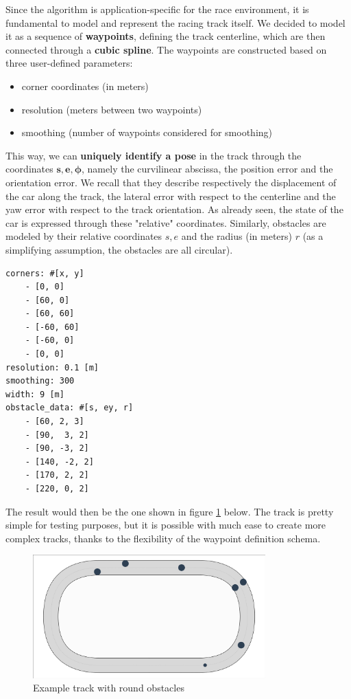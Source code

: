 \documentclass[a4paper, onecolumn, 11pt]{article}
\begin{document}
Since the algorithm is application-specific for the race environment, it is
fundamental to model and represent the racing track itself. We decided to model
it as a sequence of \textbf{waypoints}, defining the track centerline, which are
then connected through a \textbf{cubic spline}. The waypoints are constructed
based on three user-defined parameters:
\begin{itemize}
    \item corner coordinates (in meters)
    \item resolution (meters between two waypoints)
    \item smoothing (number of waypoints considered for smoothing)
\end{itemize}
This way, we can \textbf{uniquely identify a pose} in the track through the
coordinates $\mathbf{s,e,\phi}$, namely the curvilinear abscissa, the position
error and the orientation error. We recall that they describe respectively the
displacement of the car along the track, the lateral error with respect to the
centerline and the yaw error with respect to the track orientation. As already
seen, the state of the car is expressed through these "relative" coordinates.
Similarly, obstacles are modeled by their relative coordinates $s,e$ and the
radius (in meters) $r$ (as a simplifying assumption, the obstacles are all
circular).
\begin{Verbatim}[frame=single,label=Example of a track configuration file,labelposition=topline,framesep=10pt]
corners: #[x, y]
    - [0, 0]
    - [60, 0]
    - [60, 60]
    - [-60, 60]
    - [-60, 0]
    - [0, 0]
resolution: 0.1 [m]
smoothing: 300 
width: 9 [m]
obstacle_data: #[s, ey, r]
    - [60, 2, 3]
    - [90,  3, 2]
    - [90, -3, 2]
    - [140, -2, 2]
    - [170, 2, 2]
    - [220, 0, 2]
\end{Verbatim}
The result would then be the one shown in figure \ref{ippodromo} below. The
track is pretty simple for testing purposes, but it is possible with much ease
to create more complex tracks, thanks to the flexibility of the waypoint
definition schema. 
\begin{figure}[H]
    \centering
    \includegraphics[width=0.8\textwidth]{assets/ippodromo_obstacles.png}
    \caption{Example track with round obstacles}
    \label{ippodromo}
\end{figure} \vspace{0.5cm}
\end{document}

